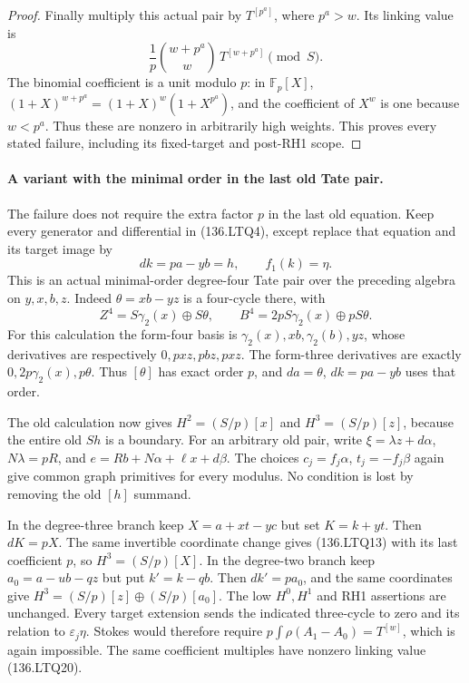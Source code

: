 \begin{proof}
Finally multiply this actual pair by \(T^{[p^a]}\),
where \(p^a>w\).  Its linking value is
\[
 \frac{1}{p}\binom{w+p^a}{w}\,T^{[w+p^a]}\pmod S.
                                                        \tag{136.LTQ20}
\]
The binomial coefficient is a unit modulo \(p\): in
\(\mathbb F_p[X]\),
\((1+X)^{w+p^a}=(1+X)^w(1+X^{p^a})\), and the
coefficient of \(X^w\) is one because \(w<p^a\).
Thus these are nonzero in arbitrarily high weights.  This
proves every stated failure, including its fixed-target and
post-RH1 scope.
\end{proof}

\paragraph{A variant with the minimal order in the last old Tate pair.}
The failure does not require the extra factor \(p\) in
the last old equation.  Keep every generator and differential
in (136.LTQ4), except replace that equation and its target image by
\[
                         dk=pa-yb=h,\qquad f_1(k)=\eta.
                                                        \tag{136.LTQ21}
\]
This is an actual minimal-order degree-four Tate pair over the
preceding algebra on \(y,x,b,z\).  Indeed
\(\theta=xb-yz\) is a four-cycle there, with
\[
 Z^4=S\gamma_2(x)\oplus S\theta,\qquad
 B^4=2pS\gamma_2(x)\oplus pS\theta.
                                                        \tag{136.LTQ22}
\]
For this calculation the form-four basis is
\(\gamma_2(x),xb,\gamma_2(b),yz\), whose derivatives
are respectively \(0,p xz,p bz,p xz\).  The
form-three derivatives are exactly \(0,2p\gamma_2(x),
p\theta\).  Thus \([\theta]\) has exact order
\(p\), and \(da=\theta\), \(dk=pa-yb\) uses
that order.

The old calculation now gives \(H^2=(S/p)[x]\) and
\(H^3=(S/p)[z]\), because the entire old \(S h\)
is a boundary.  For an arbitrary old pair, write
\(\xi=\lambda z+d\alpha\), \(N\lambda=pR\),
and \(e=Rb+N\alpha+\ell x+d\beta\).
The choices \(c_j=f_j\alpha\), \(t_j=-f_j\beta\)
again give common graph primitives for every modulus.  No
condition is lost by removing the old \([h]\) summand.

In the degree-three branch keep \(X=a+xt-yc\) but set
\(K=k+yt\).  Then \(dK=pX\).  The same invertible
coordinate change gives (136.LTQ13) with its last coefficient
\(p\), so \(H^3=(S/p)[X]\).  In the degree-two
branch keep \(a_0=a-ub-qz\) but put \(k'=k-qb\).
Then \(dk'=pa_0\), and the same coordinates give
\(H^3=(S/p)[z]\oplus(S/p)[a_0]\).  The low
\(H^0,H^1\) and RH1 assertions are unchanged.
Every target extension sends the indicated three-cycle to zero
and its relation to \(\varepsilon_j\eta\).  Stokes
would therefore require
\(p\int\rho(A_1-A_0)=T^{[w]}\), which is again
impossible.  The same coefficient multiples have nonzero
linking value (136.LTQ20).

